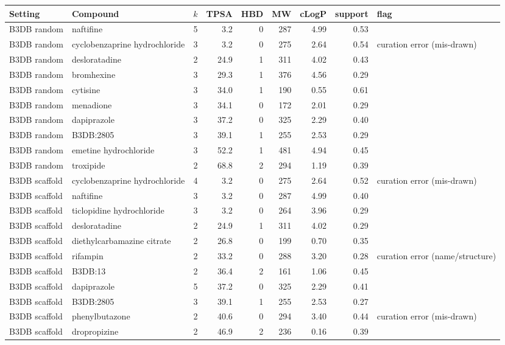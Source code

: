 \begin{tabular}{llrrrrrrl}
\toprule
Setting & Compound & $k$ & TPSA & HBD & MW & cLogP & support & flag\\
\midrule
B3DB random & naftifine & 5 & 3.2 & 0 & 287 & 4.99 & 0.53 & \\
B3DB random & cyclobenzaprine hydrochloride & 3 & 3.2 & 0 & 275 & 2.64 & 0.54 & curation error (mis-drawn)\\
B3DB random & desloratadine & 2 & 24.9 & 1 & 311 & 4.02 & 0.43 & \\
B3DB random & bromhexine & 3 & 29.3 & 1 & 376 & 4.56 & 0.29 & \\
B3DB random & cytisine & 3 & 34.0 & 1 & 190 & 0.55 & 0.61 & \\
B3DB random & menadione & 3 & 34.1 & 0 & 172 & 2.01 & 0.29 & \\
B3DB random & dapiprazole & 3 & 37.2 & 0 & 325 & 2.29 & 0.40 & \\
B3DB random & B3DB:2805 & 3 & 39.1 & 1 & 255 & 2.53 & 0.29 & \\
B3DB random & emetine hydrochloride & 3 & 52.2 & 1 & 481 & 4.94 & 0.45 & \\
B3DB random & troxipide & 2 & 68.8 & 2 & 294 & 1.19 & 0.39 & \\
B3DB scaffold & cyclobenzaprine hydrochloride & 4 & 3.2 & 0 & 275 & 2.64 & 0.52 & curation error (mis-drawn)\\
B3DB scaffold & naftifine & 3 & 3.2 & 0 & 287 & 4.99 & 0.40 & \\
B3DB scaffold & ticlopidine hydrochloride & 3 & 3.2 & 0 & 264 & 3.96 & 0.29 & \\
B3DB scaffold & desloratadine & 2 & 24.9 & 1 & 311 & 4.02 & 0.29 & \\
B3DB scaffold & diethylcarbamazine citrate & 2 & 26.8 & 0 & 199 & 0.70 & 0.35 & \\
B3DB scaffold & rifampin & 2 & 33.2 & 0 & 288 & 3.20 & 0.28 & curation error (name/structure)\\
B3DB scaffold & B3DB:13 & 2 & 36.4 & 2 & 161 & 1.06 & 0.45 & \\
B3DB scaffold & dapiprazole & 5 & 37.2 & 0 & 325 & 2.29 & 0.41 & \\
B3DB scaffold & B3DB:2805 & 3 & 39.1 & 1 & 255 & 2.53 & 0.27 & \\
B3DB scaffold & phenylbutazone & 2 & 40.6 & 0 & 294 & 3.40 & 0.44 & curation error (mis-drawn)\\
B3DB scaffold & dropropizine & 2 & 46.9 & 2 & 236 & 0.16 & 0.39 & \\

\end{tabular}
